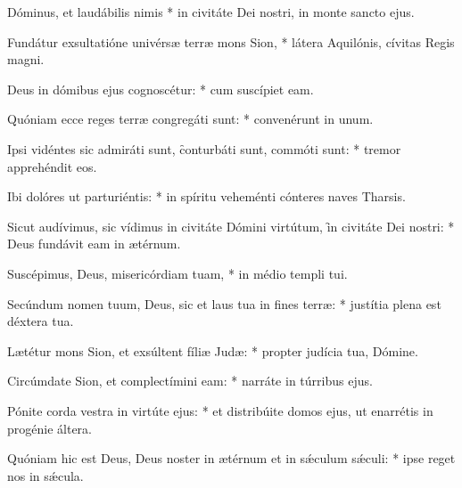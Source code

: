 \begin{psalmus}

     Dóminus, et laudábilis nimis * in civitáte Dei nostri, in monte sancto ejus.

    Fundátur exsultatióne univérsæ terræ mons Sion, * látera Aquilónis, cívitas Regis magni.

    Deus in dómibus ejus cognoscétur: * cum suscípiet eam.

    Quóniam ecce reges terræ congregáti sunt: * convenérunt in unum.

    Ipsi vidéntes sic admiráti sunt, \f conturbáti sunt, commóti sunt: * tremor apprehéndit eos.

    Ibi dolóres ut parturiéntis: * in spíritu veheménti cónteres naves Tharsis.

    Sicut audívimus, sic vídimus in civitáte Dómini virtútum, \f in civitáte Dei nostri: * Deus fundávit eam in ætérnum.

    Suscépimus, Deus, misericórdiam tuam, * in médio templi tui.

    Secúndum nomen tuum, Deus, sic et laus tua in fines terræ: * justítia plena est déxtera tua.

    Lætétur mons Sion, et exsúltent fíliæ Judæ: * propter judícia tua, Dómine.

    Circúmdate Sion, et complectímini eam: * narráte in túrribus ejus.

    Pónite corda vestra in virtúte ejus: * et distribúite domos ejus, ut enarrétis in progénie áltera.

    Quóniam hic est Deus, Deus noster in ætérnum et in sǽculum sǽculi: * ipse reget nos in sǽcula.

\end{psalmus}

